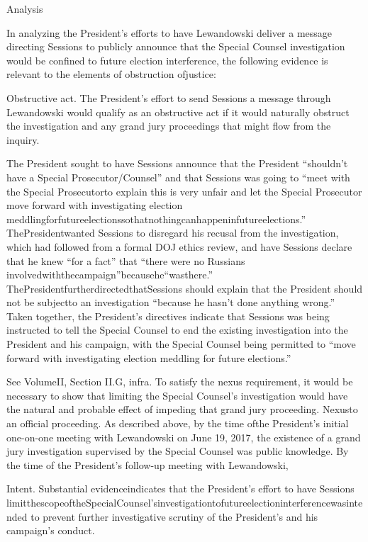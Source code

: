 {Analysis

In analyzing the President’s efforts to have Lewandowski deliver a message directing Sessions to publicly announce that the Special Counsel investigation would be confined to future election interference, the following evidence is relevant to the elements of obstruction ofjustice:

Obstructive act.
The President’s effort to send Sessions a message through Lewandowski would qualify as an obstructive act if it would naturally obstruct the investigation and any grand jury proceedings that might flow from the inquiry.

The President sought to have Sessions announce that the President “shouldn’t have a Special Prosecutor/Counsel” and that Sessions was going to “meet with the Special Prosecutorto explain this is very unfair and let the Special Prosecutor move forward with investigating election meddlingforfutureelectionssothatnothingcanhappeninfutureelections.”
ThePresidentwanted Sessions to disregard his recusal from the investigation, which had followed from a formal DOJ ethics review, and have Sessions declare that he knew “for a fact” that “there were no Russians involvedwiththecampaign”becausehe“wasthere.”
ThePresidentfurtherdirectedthatSessions should explain that the President should not be subjectto an investigation “because he hasn’t done anything wrong.”
Taken together, the President’s directives indicate that Sessions was being instructed to tell the Special Counsel to end the existing investigation into the President and his campaign, with the Special Counsel being permitted to “move forward with investigating election meddling for future elections.”

See VolumeII, Section II.G, infra.
To satisfy the nexus requirement, it would be necessary to show that limiting the Special Counsel’s investigation would have the
natural and probable effect of impeding that grand jury proceeding.
Nexusto an official proceeding.
As described above, by the time ofthe President’s initial one-on-one meeting with Lewandowski on June 19, 2017, the existence of a grand jury investigation supervised by the Special Counsel was public knowledge.
By the time of the President’s follow-up meeting with Lewandowski,

Intent.
Substantial evidenceindicates that the President’s effort to have Sessions limitthescopeoftheSpecialCounsel’sinvestigationtofutureelectioninterferencewasintended to prevent further investigative scrutiny of the President’s and his campaign’s conduct.

}
